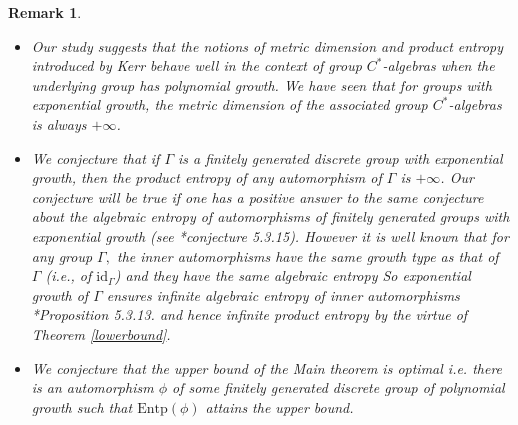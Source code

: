 \documentclass[a4paper,11pt,reqno]{amsart}
\theoremstyle{plain}
\newtheorem{rem}[thm]{Remark}
\theoremstyle{mainthmstyle}
\theoremstyle{named}
\numberwithin{equation}{section}
\begin{document}
\begin{rem}
    
    \begin{itemize}
        \item Our study suggests that the notions of metric dimension and product entropy introduced by Kerr behave well in the context of group $C^{\ast}$-algebras when the underlying group has polynomial growth. We have seen that for groups with exponential growth, the metric dimension of the associated group $C^{\ast}$-algebras is always $+\infty$.
        \vspace{2mm}
        \item We conjecture that if $\Gamma$ is a finitely generated discrete group with exponential growth, then the product entropy of any automorphism of $\Gamma$ is $+\infty$. Our conjecture will be true if one has a positive answer to the same conjecture about the algebraic entropy of automorphisms of finitely generated groups with exponential growth (see \cite{Dikranjan2013TopologicalEA}*{conjecture 5.3.15}). However it is well known that for any group $\Gamma,$ the inner automorphisms have the same growth type as that of $\Gamma$ (i.e., of $\mathrm {id}_{\Gamma}$) and they have the same algebraic entropy \cite{} So exponential growth of $\Gamma$ ensures infinite algebraic entropy of inner automorphisms \cite{Dikranjan2013TopologicalEA}*{Proposition 5.3.13.} and hence infinite product entropy by the virtue of Theorem \ref{lowerbound}. 

    \vspace{2mm}
        \item We conjecture that the upper bound of the Main theorem is optimal i.e. there is an automorphism $\phi$  of some finitely generated discrete group of polynomial growth such that $\mathrm{Entp}(\phi)$ attains the upper bound.
        \end{itemize}
\end{rem}
\appendix
\end{document}
